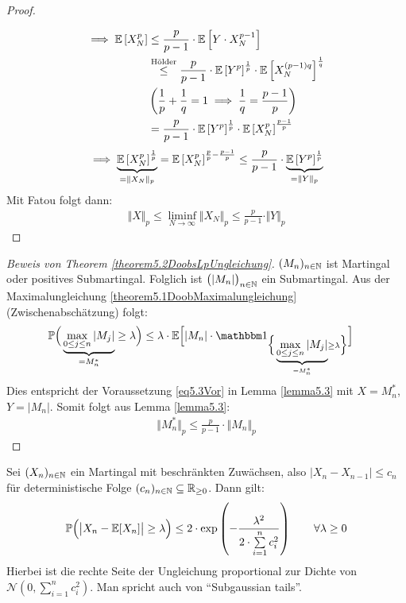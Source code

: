 \begin{proof}
\begin{align*}
	\end{align*}
	\begin{align*}
		\implies
		\mathbb{E}\left[X_N^p\right]
		&\leq \frac{p}{p-1}\cdot\mathbb{E}\left[Y\cdot X_N^{p-1}\right] \\
		&\stackrel{\text{Hölder}}{\leq}
		\frac{p}{p-1}\cdot\mathbb{E}\left[Y^p\right]^{\frac{1}{p}}\cdot\mathbb{E}\left[X_N^{(p-1)q}\right]^{\frac{1}{q}}\\
		&\left(\frac{1}{p} + \frac{1}{q} = 1 \implies \frac{1}{q} = \frac{p-1}{p}\right) \\
		&=\frac{p}{p-1}\cdot\mathbb{E}\left[Y^p\right]^{\frac{1}{p}}\cdot\mathbb{E}\left[X_N^{p}\right]^{\frac{p-1}{p}}
	\end{align*}
	\begin{align*}
		\implies
		\underbrace{\mathbb{E}\left[X_N^p\right]^{\frac{1}{p}}}_{=\Vert X_N\Vert_p}
		=\mathbb{E}\left[X_N^p\right]^{\frac{p}{p}-\frac{p-1}{p}}
		\leq
		\frac{p}{p-1}\cdot\underbrace{\mathbb{E}\left[Y^p\right]^{\frac{1}{p}}}_{=\Vert Y\Vert_p}
	\end{align*}
	Mit Fatou folgt dann:
	\begin{align*}
		\Vert X\Vert_p\leq\liminf\limits_{N\to\infty}\Vert X_N\Vert_p\leq\frac{p}{p-1}\cdot\Vert Y\Vert_p
	\end{align*}
\end{proof}

\begin{proof}[Beweis von Theorem \ref{theorem5.2DoobsLpUngleichung}]\enter
	$(M_n)_{n\in\mathbb{N}}$ ist Martingal oder positives Submartingal.
	Folglich ist $\big(|M_n|\big)_{n\in\mathbb{N}}$ ein Submartingal.
	Aus der Maximalungleichung 	\ref{theorem5.1DoobMaximalungleichung} (Zwischenabschätzung) folgt:
	\begin{align*}
		\P\Big(\underbrace{\max\limits_{0\leq j\leq n}|M_j|}_{=M_n^\ast}\geq\lambda\Big)
		&\leq\lambda\cdot\E\Big[|M_n|\cdot\indi_{\Big\lbrace\underbrace{\max\limits_{0\leq j\leq n}|M_j|}_{=M_n^\ast}\geq\lambda\Big\rbrace}\Big]
	\end{align*}
	Dies entspricht der Voraussetzung \eqref{eq5.3Vor} in Lemma \ref{lemma5.3} mit $X=M_n^\ast$, $Y=|M_n|$. Somit folgt aus Lemma \ref{lemma5.3}:
	\begin{align*}
		\big\Vert M_n^\ast\big\Vert_p\leq\frac{p}{p-1}\cdot\big\Vert M_n\big\Vert_p
	\end{align*}
\end{proof}

\begin{theorem}\label{theorem5.4AzumasUngleichung}\enter
	Sei $(X_n)_{n\in\mathbb{N}}$ ein Martingal mit beschränkten Zuwächsen, also $\big|X_n-X_{n-1}\big|\leq c_n$ für deterministische Folge $(c_n)_{n\in\mathbb{N}}\subseteq\mathbb{R}_{\geq0}$. Dann gilt:
	\begin{align*}
		\mathbb{P}\Big(\big|X_n-\mathbb{E}[X_n]\big|\geq\lambda\Big)\leq2\cdot\exp\left(-\frac{\lambda^2}{2\cdot\sum\limits_{i=1}^n c_i^2}\right)\qquad\forall\lambda\geq0
	\end{align*}
	Hierbei ist die rechte Seite der Ungleichung proportional zur Dichte von $\mathcal{N}\left(0,\sum\limits_{i=1}^n c_i^2\right)$.
	Man spricht auch von ``Subgaussian tails''.
\end{theorem}

